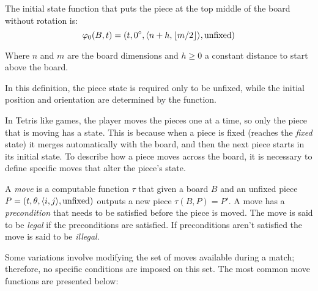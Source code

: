 \begin{example} The initial state function that puts the piece at the top middle of the board without rotation is:
$$\varphi_0(B,t) = \piece[t][0^\circ][n + h][\lfloor m / 2 \rfloor][\text{unfixed}]$$

Where $n$ and $m$ are the board dimensions and $h \geq 0$ a constant distance to start above the board.

\end{example}

In this definition, the piece state is required only to be unfixed, while the initial position and orientation are determined by the function.  

\vspace{10px}

In Tetris like games, the player moves the pieces one at a time, so only the piece that is moving has a state. This is because when a piece is fixed (reaches the \emph{fixed} state) it merges automatically with the board, and then the next piece starts in its initial state. To describe how a piece moves across the board, it is necessary to define specific moves that alter the piece's state.  

\begin{definition} 
  A \emph{move} is a computable function $\tau$ that given a board $B$ and an unfixed piece $P = \piece[t][\theta][i][j][\text{unfixed}]$ outputs a new piece $\tau(B, P) = P'$. A move has a \emph{precondition} that needs to be satisfied before the piece is moved. The move is said to be \emph{legal} if the preconditions are satisfied. If preconditions aren't satisfied the move is said to be \emph{illegal}.
\end{definition}

Some variations involve modifying the set of moves available during a match; therefore, no specific conditions are imposed on this set. The most common move functions are presented below:  

